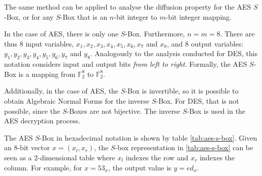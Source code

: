 \documentclass{report}
\begin{document}
The same method can be applied to analyse the diffusion property for the AES $S$-Box, or for any $S$-Box that is an $n$-bit integer to $m$-bit integer mapping.

In the case of AES, there is only one $S$-Box. Furthermore, $n = m = 8$. There are thus 8 input variables, $x_1, x_2, x_3, x_4, x_5, x_6, x_7$ and $x_8$, and 8 output variables: $y_1, y_2, y_3, y_4, y_5, y_6, y_7$ and $y_8$. Analogously to the analysis conducted for DES, this notation considers input and output bits \emph{from left to right}. Formally, the AES $S$-Box is a mapping from $\mathbb{F}^8_2$ to $\mathbb{F}^8_2$.

Additionally, in the case of AES, the $S$-Box is invertible, so it is possible to obtain Algebraic Normal Forms for the inverse $S$-Box. For DES, that is not possible, since the $S$-Boxes are not bijective. The inverse $S$-Box is used in the AES decryption process.


The AES $S$-Box in hexadecimal notation is shown by table \ref{tab:aes-s-box}. Given an 8-bit vector $x = (x_l,x_r)$, the $S$-box representation in \ref{tab:aes-s-box} can be seen as a 2-dimensional table where $x_l$ indexes the row and $x_r$ indexes the column. For example, for $x = 53_x$, the output value is $y = ed_x$.
\end{document}

